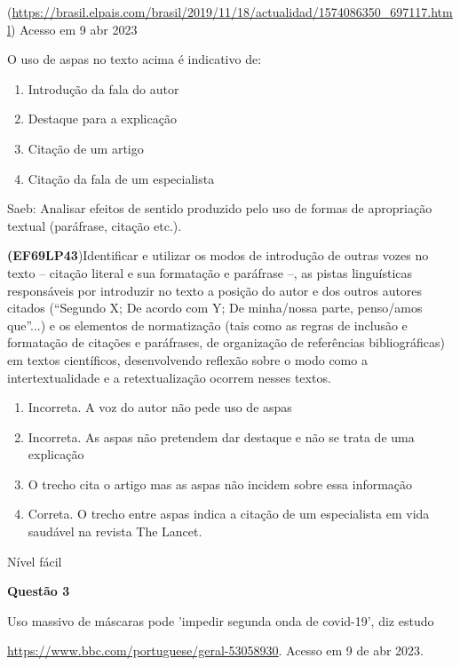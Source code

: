 {(\href{https://brasil.elpais.com/brasil/2019/11/18/actualidad/1574086350_697117.html}{\uline{https://brasil.elpais.com/brasil/2019/11/18/actualidad/1574086350\_697117.html}})
Acesso em 9 abr 2023

O uso de aspas no texto acima é indicativo de:

\begin{enumerate}
\def\labelenumi{\alph{enumi})}
\item
  Introdução da fala do autor
\item
  Destaque para a explicação
\item
  Citação de um artigo
\item
  Citação da fala de um especialista
\end{enumerate}

Saeb: Analisar efeitos de sentido produzido pelo uso de formas de
apropriação textual (paráfrase, citação etc.).

\textbf{(EF69LP43})Identificar e utilizar os modos de introdução de
outras vozes no texto -- citação literal e sua formatação e paráfrase
--, as pistas linguísticas responsáveis por introduzir no texto a
posição do autor e dos outros autores citados (``Segundo X; De acordo
com Y; De minha/nossa parte, penso/amos que''...) e os elementos de
normatização (tais como as regras de inclusão e formatação de citações e
paráfrases, de organização de referências bibliográficas) em textos
científicos, desenvolvendo reflexão sobre o modo como a
intertextualidade e a retextualização ocorrem nesses textos.

\begin{enumerate}
\def\labelenumi{\arabic{enumi}.}
\item
  Incorreta. A voz do autor não pede uso de aspas
\item
  Incorreta. As aspas não pretendem dar destaque e não se trata de uma
  explicação
\item
  O trecho cita o artigo mas as aspas não incidem sobre essa informação
\item
  Correta. O trecho entre aspas indica a citação de um especialista em
  vida saudável na revista The Lancet.
\end{enumerate}

Nível fácil

\textbf{Questão 3}

Uso massivo de máscaras pode 'impedir segunda onda de covid-19', diz
estudo

\href{https://www.bbc.com/portuguese/geral-53058930}{\uline{https://www.bbc.com/portuguese/geral-53058930}}.
Acesso em 9 de abr 2023.

}
